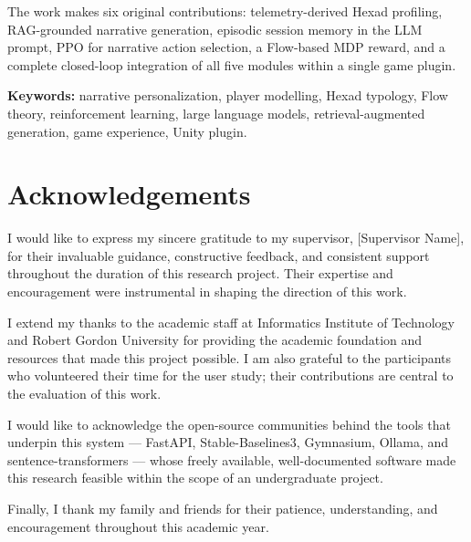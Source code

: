 \documentclass[12pt,a4paper]{report}
\begin{document}
The work makes six original contributions: telemetry-derived Hexad profiling, RAG-grounded narrative generation, episodic session memory in the LLM prompt, PPO for narrative action selection, a Flow-based MDP reward, and a complete closed-loop integration of all five modules within a single game plugin.

\vspace{0.5cm}
\noindent\textbf{Keywords:} narrative personalization, player modelling, Hexad typology, Flow theory, reinforcement learning, large language models, retrieval-augmented generation, game experience, Unity plugin.

\clearpage

\chapter*{Acknowledgements}

I would like to express my sincere gratitude to my supervisor, [Supervisor Name], for their invaluable guidance, constructive feedback, and consistent support throughout the duration of this research project. Their expertise and encouragement were instrumental in shaping the direction of this work.

I extend my thanks to the academic staff at Informatics Institute of Technology and Robert Gordon University for providing the academic foundation and resources that made this project possible. I am also grateful to the participants who volunteered their time for the user study; their contributions are central to the evaluation of this work.

I would like to acknowledge the open-source communities behind the tools that underpin this system --- FastAPI, Stable-Baselines3, Gymnasium, Ollama, and sentence-transformers --- whose freely available, well-documented software made this research feasible within the scope of an undergraduate project.

Finally, I thank my family and friends for their patience, understanding, and encouragement throughout this academic year.

\clearpage

\tableofcontents
\newpage
\listoffigures
\newpage
\listoftables
\newpage
\end{document}
